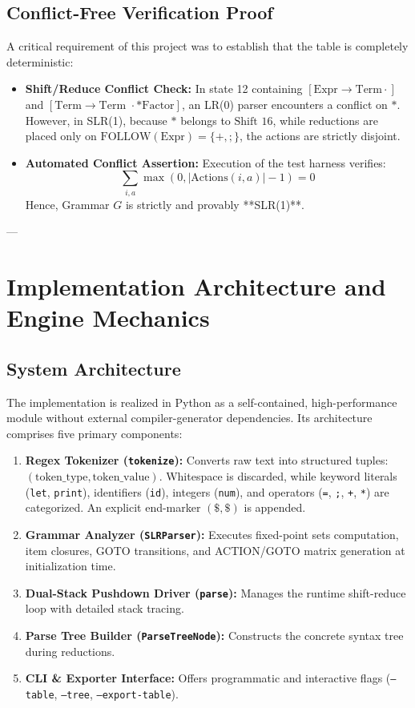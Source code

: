 \documentclass[11pt,a4paper]{article}
\begin{document}
\subsection{Conflict-Free Verification Proof}
A critical requirement of this project was to establish that the table is completely deterministic:
\begin{itemize}
    \item \textbf{Shift/Reduce Conflict Check:} In state 12 containing $[\text{Expr} \to \text{Term} \cdot]$ and $[\text{Term} \to \text{Term } \cdot * \text{Factor}]$, an LR(0) parser encounters a conflict on $*$. However, in SLR(1), because $*$ belongs to $\text{Shift } 16$, while reductions are placed only on $\text{FOLLOW}(\text{Expr}) = \{ +, ; \}$, the actions are strictly disjoint.
    \item \textbf{Automated Conflict Assertion:} Execution of the test harness verifies:
    $$\sum_{i, a} \max(0, |\text{Actions}(i, a)| - 1) = 0$$
    Hence, Grammar $G$ is strictly and provably **SLR(1)**.
\end{itemize}

---

\section{Implementation Architecture and Engine Mechanics}

\subsection{System Architecture}
The implementation is realized in Python as a self-contained, high-performance module without external compiler-generator dependencies. Its architecture comprises five primary components:
\begin{enumerate}
    \item \textbf{Regex Tokenizer (\texttt{tokenize}):} Converts raw text into structured tuples: $(\text{token\_type}, \text{token\_value})$. Whitespace is discarded, while keyword literals (\texttt{let}, \texttt{print}), identifiers (\texttt{id}), integers (\texttt{num}), and operators (\texttt{=}, \texttt{;}, \texttt{+}, \texttt{*}) are categorized. An explicit end-marker $(\texttt{\$}, \texttt{\$})$ is appended.
    \item \textbf{Grammar Analyzer (\texttt{SLRParser}):} Executes fixed-point sets computation, item closures, GOTO transitions, and ACTION/GOTO matrix generation at initialization time.
    \item \textbf{Dual-Stack Pushdown Driver (\texttt{parse}):} Manages the runtime shift-reduce loop with detailed stack tracing.
    \item \textbf{Parse Tree Builder (\texttt{ParseTreeNode}):} Constructs the concrete syntax tree during reductions.
    \item \textbf{CLI \& Exporter Interface:} Offers programmatic and interactive flags (\texttt{--table}, \texttt{--tree}, \texttt{--export-table}).
\end{enumerate}
\end{document}

